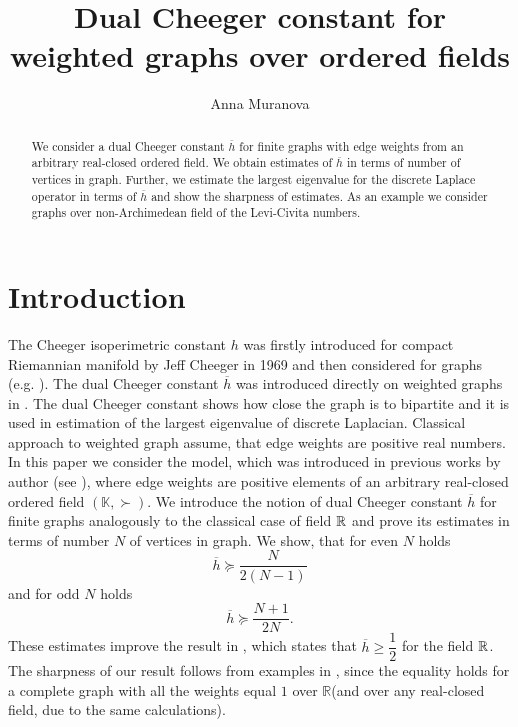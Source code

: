 \documentclass[a4paper,12pt]{amsart}
\author{Anna Muranova}
\title[Dual Cheeger constant for OF-graphs]{Dual Cheeger constant for weighted graphs over ordered fields}
\theoremstyle{definition}
\newcommand{\h}{\overline{h}}
\newcommand{\K}{\mathbb{K}}
\begin{document}
                         
\maketitle

\medskip
    \begin{abstract}


We consider a dual Cheeger constant $\h$ for finite graphs with edge weights from an arbitrary real-closed ordered field.  We obtain estimates of $\h$ in terms of number of vertices in graph. Further, we estimate the largest eigenvalue for the discrete Laplace operator in terms of $\h$ and show the sharpness of estimates. As an example we consider graphs over non-Archimedean field of the Levi-Civita numbers.
    
    \end{abstract}

\section*{Introduction}
The Cheeger isoperimetric constant $h$ was firstly introduced for compact Riemannian manifold by Jeff Cheeger \cite{Cheeger} in 1969 and then considered for graphs (e.g. \cite{Chung, Mohar}). The dual Cheeger constant $\overline h$ was introduced directly on weighted graphs in \cite{BauerJost}. The dual Cheeger constant shows how close the graph is to bipartite and it is used in estimation of the largest eigenvalue of discrete Laplacian.  Classical approach to weighted graph assume, that edge weights are positive real numbers. In this paper we consider the model, which was introduced in previous works by author (see \cite{Muranova1, Muranova2, MuranovaPreprint22}), where edge weights are positive elements of an arbitrary  real-closed ordered field $(\K, \succ)$. We introduce the notion of dual Cheeger constant $\overline h$ for finite graphs analogously to the classical case of field $\Bbb R$ and prove its estimates in terms of number $N$ of vertices in graph. We show, that for even $N$ holds
$$
\overline h\succeq \dfrac{N}{2(N-1)}
$$
and for odd $N$ holds
$$
\overline h\succeq \dfrac{N+1}{2N}.
$$
These estimates improve the result in \cite{BauerJost}, which states that $\overline h\ge \dfrac{1}{2}$ for the field $\Bbb R$. The sharpness of our result follows from examples in \cite{BauerJost}, since the equality holds for a complete graph with all the weights equal $1$ over $\mathbb R$(and over any real-closed field, due to the same calculations). 
\end{document}
